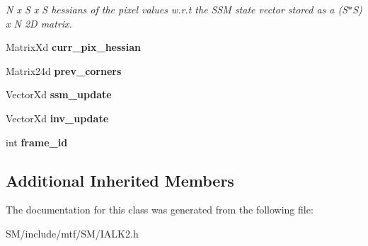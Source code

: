 \begin{DoxyCompactItemize}
\begin{DoxyCompactList}\small\item\em N x S x S hessians of the pixel values w.\-r.\-t the S\-S\-M state vector stored as a (S$\ast$\-S) x N 2\-D matrix. \end{DoxyCompactList}\item 
\hypertarget{classIALK2_a7af6e78521d67b691653423a18e77a0b}{Matrix\-Xd {\bfseries curr\-\_\-pix\-\_\-hessian}}\label{classIALK2_a7af6e78521d67b691653423a18e77a0b}

\item 
\hypertarget{classIALK2_a8f3465edc4b825c9e2b897f24f1ad156}{Matrix24d {\bfseries prev\-\_\-corners}}\label{classIALK2_a8f3465edc4b825c9e2b897f24f1ad156}

\item 
\hypertarget{classIALK2_ac4b58e3e8002bd51b7287d7da40aed6c}{Vector\-Xd {\bfseries ssm\-\_\-update}}\label{classIALK2_ac4b58e3e8002bd51b7287d7da40aed6c}

\item 
\hypertarget{classIALK2_abb1bc228c541af9ff0acaca60f0dfd85}{Vector\-Xd {\bfseries inv\-\_\-update}}\label{classIALK2_abb1bc228c541af9ff0acaca60f0dfd85}

\item 
\hypertarget{classIALK2_a0afdaf9be67063c26648f9e2312c988b}{int {\bfseries frame\-\_\-id}}\label{classIALK2_a0afdaf9be67063c26648f9e2312c988b}

\end{DoxyCompactItemize}
\subsection*{Additional Inherited Members}


The documentation for this class was generated from the following file\-:\begin{DoxyCompactItemize}
\item 
S\-M/include/mtf/\-S\-M/I\-A\-L\-K2.\-h\end{DoxyCompactItemize}
